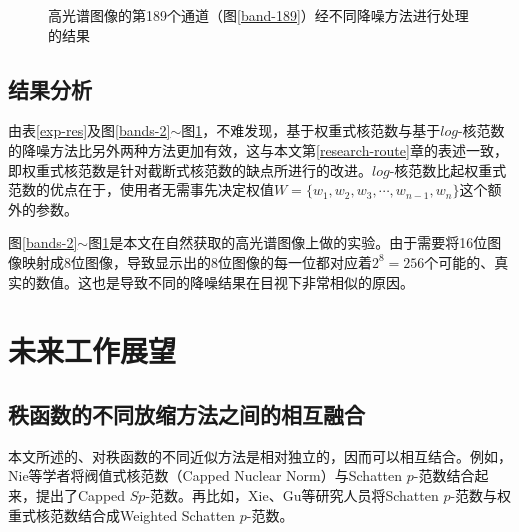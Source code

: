 \documentclass[12pt, a4paper]{article}
\begin{document}
\begin{figure}[htbp]
\caption{高光谱图像的第189个通道（图\ref{band-189}）经不同降噪方法进行处理的结果}
\label{bands-189}
\end{figure}
\subsection{结果分析}
\par 由表\ref{exp-res}及图\ref{bands-2}$\sim$图\ref{bands-189}，不难发现，基于权重式核范数与基于$log$-核范数的降噪方法比另外两种方法更加有效，这与本文第\ref{research-route}章的表述一致，即权重式核范数是针对截断式核范数的缺点所进行的改进。$log$-核范数比起权重式范数的优点在于，使用者无需事先决定权值$W=\{w_1, w_2, w_3, \cdots, w_{n-1}, w_n\}$这个额外的参数。
\par 图\ref{bands-2}$\sim$图\ref{bands-189}是本文在自然获取的高光谱图像上做的实验。由于需要将16位图像映射成8位图像，导致显示出的8位图像的每一位都对应着$2^8=256$个可能的、真实的数值。这也是导致不同的降噪结果在目视下非常相似的原因。
\newpage
\section{未来工作展望}
\subsection{秩函数的不同放缩方法之间的相互融合}
\par 本文所述的、对秩函数的不同近似方法是相对独立的，因而可以相互结合。例如，Nie等学者将阀值式核范数（Capped Nuclear Norm）与Schatten $p$-范数结合起来，提出了Capped $Sp$-范数\cite{CNN-2}。再比如，Xie、Gu等研究人员将Schatten $p$-范数与权重式核范数结合成Weighted Schatten $p$-范数\cite{merge-2}。
\end{document}
